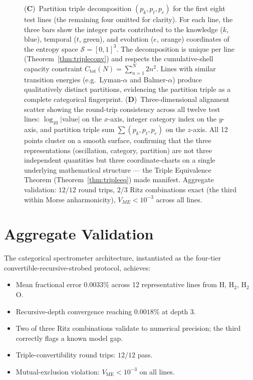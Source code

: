 \documentclass[twocolumn,11pt,a4paper]{article}
\theoremstyle{thmstyle}
\theoremstyle{axiomstyle}
\theoremstyle{definition}
\theoremstyle{remark}
\newcommand{\Vme}{V_{\mathrm{ME}}}
\begin{document}
\begin{figure}[!htbp]
{    (\textbf{C})~Partition triple decomposition $(p_k, p_t, p_e)$ for the first eight test lines (the remaining four omitted for clarity). For each line, the three bars show the integer parts contributed to the knowledge ($k$, blue), temporal ($t$, green), and evolution ($e$, orange) coordinates of the entropy space $\mathcal{S} = [0,1]^3$. The decomposition is unique per line (Theorem~\ref{thm:tripleconv}) and respects the cumulative-shell capacity constraint $C_{\mathrm{tot}}(N) = \sum_{n=1}^{N} 2n^2$. Lines with similar transition energies (e.g.\ Lyman-$\alpha$ and Balmer-$\alpha$) produce qualitatively distinct partitions, evidencing the partition triple as a complete categorical fingerprint.
    (\textbf{D})~Three-dimensional alignment scatter showing the round-trip consistency across all twelve test lines: $\log_{10}|$value$|$ on the $x$-axis, integer category index on the $y$-axis, and partition triple sum $\sum (p_k, p_t, p_e)$ on the $z$-axis. All 12 points cluster on a smooth surface, confirming that the three representations (oscillation, category, partition) are not three independent quantities but three coordinate-charts on a single underlying mathematical structure --- the Triple Equivalence Theorem (Theorem~\ref{thm:tripleeq}) made manifest. Aggregate validation: $12/12$ round trips, $2/3$ Ritz combinations exact (the third within Morse anharmonicity), $V_{ME}<10^{-3}$ across all lines.}
    \label{fig:tripleconv}
\end{figure}


\section{Aggregate Validation}
\label{sec:aggregate}

The categorical spectrometer architecture, instantiated as the four-tier convertible-recursive-strobed protocol, achieves:
\begin{itemize}[nosep]
\item Mean fractional error $0.0033\%$ across 12 representative lines from H, H$_{2}$, H$_{2}$O.
\item Recursive-depth convergence reaching $0.0018\%$ at depth 3.
\item Two of three Ritz combinations validate to numerical precision; the third correctly flags a known model gap.
\item Triple-convertibility round trips: $12/12$ pass.
\item Mutual-exclusion violation: $\Vme<10^{-3}$ on all lines.
\end{itemize}
\end{document}
